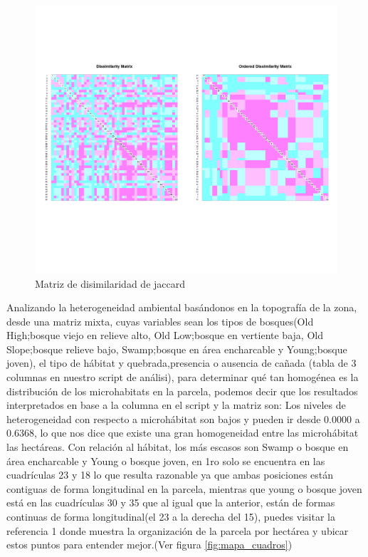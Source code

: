 \documentclass[11pt,]{article}
\begin{document}
\begin{figure}
\centering
\includegraphics{diss_jaccard.png}
\caption{\label{fig:diss_jaccard}Matriz de disimilaridad de jaccard}
\end{figure}

Analizando la heterogeneidad ambiental basándonos en la topografía de la
zona, desde una matriz mixta, cuyas variables sean los tipos de
bosques(Old High;bosque viejo en relieve alto, Old Low;bosque en
vertiente baja, Old Slope;bosque relieve bajo, Swamp;bosque en área
encharcable y Young;bosque joven), el tipo de hábitat y
quebrada,presencia o ausencia de cañada (tabla de 3 columnas en nuestro
script de análisi), para determinar qué tan homogénea es la distribución
de los microhabitats en la parcela, podemos decir que los resultados
interpretados en base a la columna en el script y la matriz son: Los
niveles de heterogeneidad con respecto a microhábitat son bajos y pueden
ir desde 0.0000 a 0.6368, lo que nos dice que existe una gran
homogeneidad entre las microhábitat las hectáreas. Con relación al
hábitat, los más escasos son Swamp o bosque en área encharcable y Young
o bosque joven, en 1ro solo se encuentra en las cuadrículas 23 y 18 lo
que resulta razonable ya que ambas posiciones están contiguas de forma
longitudinal en la parcela, mientras que young o bosque joven está en
las cuadrículas 30 y 35 que al igual que la anterior, están de formas
continuas de forma longitudinal(el 23 a la derecha del 15), puedes
visitar la referencia 1 donde muestra la organización de la parcela por
hectárea y ubicar estos puntos para entender mejor.(Ver figura
\ref{fig:mapa_cuadros})
\end{document}
